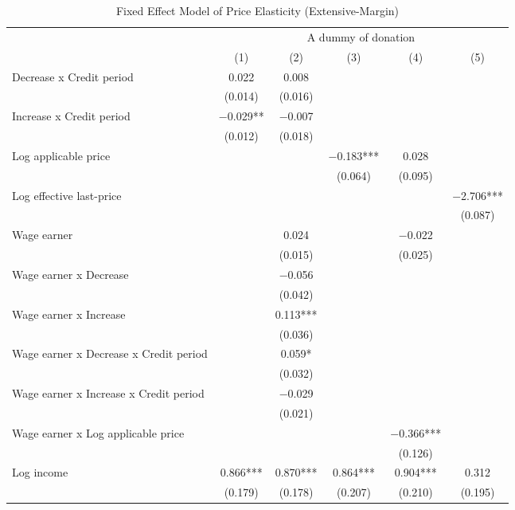 \begin{table}

\caption{Fixed Effect Model of Price Elasticity (Extensive-Margin)\label{tab:fe-model-ext}}
\centering
\fontsize{8}{10}\selectfont
\begin{threeparttable}
\begin{tabular}[t]{lccccc}
\toprule
\multicolumn{1}{c}{ } & \multicolumn{5}{c}{A dummy of donation} \\
\cmidrule(l{3pt}r{3pt}){2-6}
  & (1) & (2) & (3) & (4) & (5)\\
\midrule
Decrease x Credit period & \num{0.022} & \num{0.008} &  &  & \\
 & (\num{0.014}) & (\num{0.016}) &  &  & \\
Increase x Credit period & \num{-0.029}** & \num{-0.007} &  &  & \\
 & (\num{0.012}) & (\num{0.018}) &  &  & \\
Log applicable price &  &  & \num{-0.183}*** & \num{0.028} & \\
 &  &  & (\num{0.064}) & (\num{0.095}) & \\
Log effective last-price &  &  &  &  & \num{-2.706}***\\
 &  &  &  &  & (\num{0.087})\\
Wage earner &  & \num{0.024} &  & \num{-0.022} & \\
 &  & (\num{0.015}) &  & (\num{0.025}) & \\
Wage earner x Decrease &  & \num{-0.056} &  &  & \\
 &  & (\num{0.042}) &  &  & \\
Wage earner x Increase &  & \num{0.113}*** &  &  & \\
 &  & (\num{0.036}) &  &  & \\
Wage earner x Decrease x Credit period &  & \num{0.059}* &  &  & \\
 &  & (\num{0.032}) &  &  & \\
Wage earner x Increase x Credit period &  & \num{-0.029} &  &  & \\
 &  & (\num{0.021}) &  &  & \\
Wage earner x Log applicable price &  &  &  & \num{-0.366}*** & \\
 &  &  &  & (\num{0.126}) & \\
Log income & \num{0.866}*** & \num{0.870}*** & \num{0.864}*** & \num{0.904}*** & \num{0.312}\\
 & (\num{0.179}) & (\num{0.178}) & (\num{0.207}) & (\num{0.210}) & (\num{0.195})\\

\end{tabular}
\end{threeparttable}
\end{table}
